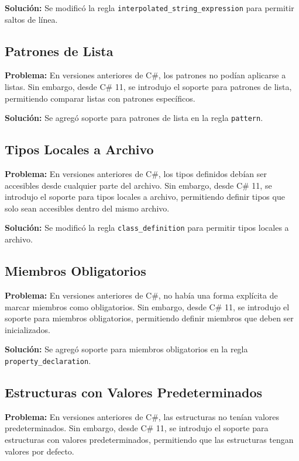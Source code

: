 \textbf{Solución:} Se modificó la regla \texttt{interpolated\_string\_expression} para permitir saltos de línea.

\subsection{Patrones de Lista}

\textbf{Problema:} En versiones anteriores de C\#, los patrones no podían aplicarse a listas. Sin embargo, desde C\# 11, se introdujo el soporte para patrones de lista, permitiendo comparar listas con patrones específicos.

\textbf{Solución:} Se agregó soporte para patrones de lista en la regla \texttt{pattern}.

\subsection{Tipos Locales a Archivo}

\textbf{Problema:} En versiones anteriores de C\#, los tipos definidos debían ser accesibles desde cualquier parte del archivo. Sin embargo, desde C\# 11, se introdujo el soporte para tipos locales a archivo, permitiendo definir tipos que solo sean accesibles dentro del mismo archivo.

\textbf{Solución:} Se modificó la regla \texttt{class\_definition} para permitir tipos locales a archivo.

\subsection{Miembros Obligatorios}

\textbf{Problema:} En versiones anteriores de C\#, no había una forma explícita de marcar miembros como obligatorios. Sin embargo, desde C\# 11, se introdujo el soporte para miembros obligatorios, permitiendo definir miembros que deben ser inicializados.

\textbf{Solución:} Se agregó soporte para miembros obligatorios en la regla \texttt{property\_declaration}.

\subsection{Estructuras con Valores Predeterminados}

\textbf{Problema:} En versiones anteriores de C\#, las estructuras no tenían valores predeterminados. Sin embargo, desde C\# 11, se introdujo el soporte para estructuras con valores predeterminados, permitiendo que las estructuras tengan valores por defecto.

